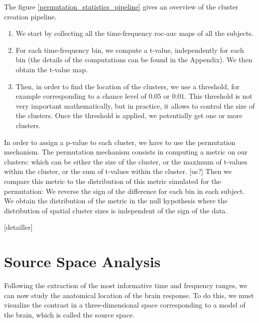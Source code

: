 The figure \ref{permutation_statistics_pipeline} gives an overview of the cluster creation pipeline.
\begin{enumerate}
    \item We start by collecting all the time-frequency roc-auc maps of all the subjects.
    \item For each time-frequency bin, we compute a t-value, independently for each bin (the details of the computations can be found in the Appendix). We then obtain the t-value map.
    \item Then, in order to find the location of the clusters, we use a threshold, for example corresponding to a chance level of $0.05$ or $0.01$. This threshold is not very important mathematically, but in practice, it allows to control the size of the clusters. Once the threshold is applied, we potentially get one or more clusters.
\end{enumerate}

In order to assign a p-value to each cluster, we have to use the permutation mechanism. The permutation mechanism consists in computing a metric on our clusters: which can be either the size of the cluster, or the maximum of t-values within the cluster, or the sum of t-values within the cluster. [us?] Then we compare this metric to the distribution of this metric simulated for the permutation:
We reverse the sign of the difference for each bin in each subject. We obtain the distribution of the metric in the null hypothesis where the distribution of spatial cluster sizes is independent of the sign of the data.

[detailler]

\section{Source Space Analysis}

Following the extraction of the most informative time and frequency ranges, we can now study the anatomical location of the brain response. To do this, we must visualize the contrast in a three-dimensional space corresponding to a model of the brain, which is called the source space.


